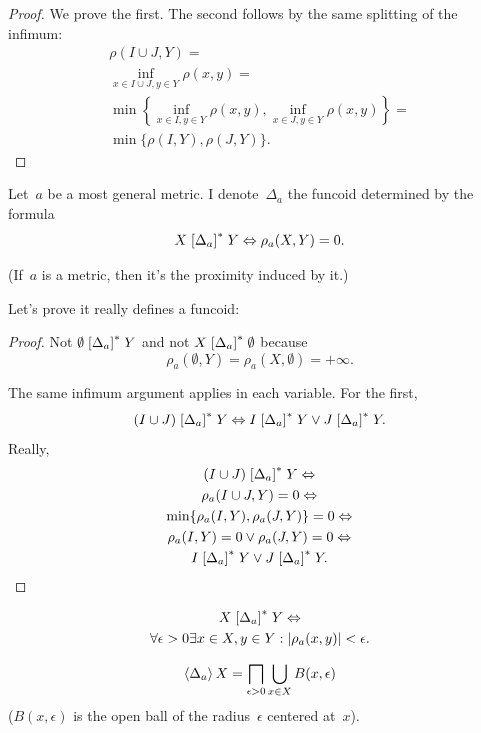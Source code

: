 \begin{proof}
We prove the first. The second follows by the same splitting of the infimum:
\begin{multline*}
\rho(I\cup J,Y) = \\
\inf_{x\in I\cup J,y\in Y}\rho(x,y) = \\
\min\left\{\inf_{x\in I,y\in Y}\rho(x,y), \inf_{x\in J,y\in Y}\rho(x,y)\right\} = \\
\min\{\rho(I,Y), \rho(J,Y)\}.
\end{multline*}
\end{proof}

Let~$a$ be a most general metric. I denote~$\Delta_a$ the funcoid determined by the formula
\[
X\mathrel{\left[\Delta_a\right]^{\ast}}Y \Leftrightarrow \rho_a(X,Y)=0.
\]

(If~$a$ is a metric, then it's the proximity induced by it.)

Let's prove it really defines a funcoid:

\begin{proof}
Not $\emptyset\mathrel{\left[\Delta_a\right]^{\ast}}Y$ and not $X\mathrel{\left[\Delta_a\right]^{\ast}}\emptyset$ because \[ \rho_{a}(\emptyset,Y)=\rho_{a}(X,\emptyset)=+\infty. \]

The same infimum argument applies in each variable. For the first,
\[ (I\cup J)\mathrel{\left[\Delta_a\right]^{\ast}}Y \Leftrightarrow
I\mathrel{\left[\Delta_a\right]^{\ast}}Y \lor J\mathrel{\left[\Delta_a\right]^{\ast}}Y. \]
Really,
\begin{multline*}
(I\cup J)\mathrel{\left[\Delta_a\right]^{\ast}}Y \Leftrightarrow \\
\rho_a(I\cup J,Y)=0 \Leftrightarrow \\
\min\{\rho_a(I,Y),\rho_a(J,Y)\}=0 \Leftrightarrow \\
\rho_a(I,Y)=0\lor\rho_a(J,Y)=0 \Leftrightarrow \\
I\mathrel{\left[\Delta_a\right]^{\ast}}Y \lor J\mathrel{\left[\Delta_a\right]^{\ast}}Y.
\end{multline*}
\end{proof}

\begin{obvious}
\begin{multline*}
X\mathrel{\left[\Delta_a\right]^{\ast}}Y \Leftrightarrow \\
\forall\epsilon>0\exists x\in X,y\in Y:
\lvert\rho_a(x,y)\rvert<\epsilon.
\end{multline*}
\end{obvious}

\begin{thm}
\[ \left\langle \Delta_a\right\rangle X = \bigsqcap_{\epsilon>0}\bigcup_{x\in X}B(x,\epsilon) \]
($B(x,\epsilon)$ is the open ball of the radius~$\epsilon$ centered at~$x$).
\end{thm}

